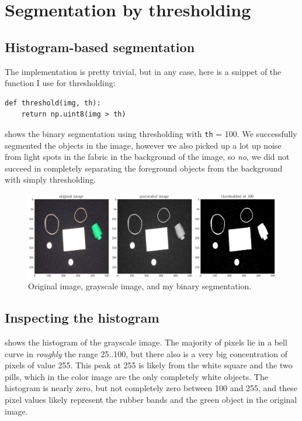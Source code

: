 \section{Segmentation by thresholding}
\subsection{Histogram-based segmentation}

The implementation is pretty trivial, but in any case, here is a snippet of the
function I use for thresholding:

\begin{verbatim}
def threshold(img, th):
    return np.uint8(img > th)
\end{verbatim}

 shows the binary segmentation using thresholding with \texttt{th}
= 100. We successfully segmented the objects in the image, however we also
picked up a lot up noise from light spots in the fabric in the background of the
image, so \emph{no}, we did not succeed in completely separating the foreground
objects from the background with simply thresholding.

\begin{figure}[H]
    \centering
    \includegraphics[width=\textwidth]{figures/task_4_1.png}
    \caption{Original image, grayscale image, and my binary segmentation.}
    \label{fig:4.1}
\end{figure}


\subsection{Inspecting the histogram}

 shows the histogram of the grayscale image. The majority of
pixels lie in a bell curve in \emph{roughly} the range 25..100, but there also
is a very big concentration of pixels of value 255. This peak at 255 is likely
from the white square and the two pills, which in the color image are the only
completely white objects. The histogram is nearly zero, but not completely zero
between 100 and 255, and these pixel values likely represent the rubber bands
and the green object in the original image.


